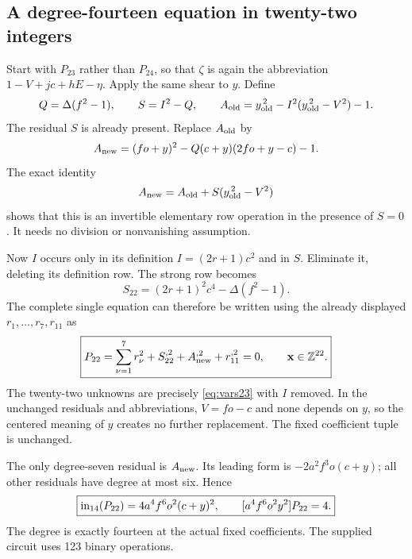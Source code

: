 \subsection{A degree-fourteen equation in twenty-two integers}

Start with $P_{23}$ rather than $P_{24}$, so that $\zeta$ is again the
abbreviation $1-V+jc+hE-\eta$. Apply the same shear to $y$. Define
\[
 Q=\Delta(f^2-1),\qquad S=I^2-Q,
 \qquad A_{\rm old}=y_{\rm old}^{\,2}
       -I^2(y_{\rm old}^{\,2}-V^2)-1.
\]
The residual $S$ is already present. Replace $A_{\rm old}$ by
\begin{equation}
 A_{\rm new}=(fo+y)^2-Q(c+y)(2fo+y-c)-1.
 \label{eq:aux22}
\end{equation}
The exact identity
\begin{equation}
 A_{\rm new}=A_{\rm old}+S(y_{\rm old}^{\,2}-V^2)
 \label{eq:row22}
\end{equation}
shows that this is an invertible elementary row operation in the presence
of $S=0$. It needs no division or nonvanishing assumption.

Now $I$ occurs only in its definition $I=(2r+1)c^2$ and in $S$.
Eliminate it, deleting its definition row. The strong row becomes
\begin{equation}
 S_{22}=(2r+1)^2c^4-\Delta(f^2-1).
 \label{eq:strong22}
\end{equation}
The complete single equation can therefore be written using the already
displayed $r_1,\ldots,r_7,r_{11}$ as
\begin{equation}
 \boxed{P_{22}=\sum_{\nu=1}^{7}r_\nu^2
              +S_{22}^{,2}+A_{\rm new}^{,2}+r_{11}^{,2}=0,
 \qquad\mathbf x\in\mathbb Z^{22}.}
 \label{eq:P22}
\end{equation}
The twenty-two unknowns are precisely \eqref{eq:vars23} with $I$
removed. In the unchanged residuals and abbreviations, $V=fo-c$ and
none depends on $y$, so the centered meaning of $y$ creates no further
replacement. The fixed coefficient tuple is unchanged.

The only degree-seven residual is $A_{\rm new}$. Its leading form is
$-2a^2f^3o(c+y)$; all other residuals have degree at most six. Hence
\begin{equation}
 \boxed{\operatorname{in}_{14}(P_{22})=4a^4f^6o^2(c+y)^2,
 \qquad[a^4f^6o^2y^2]P_{22}=4.}
 \label{eq:leading22}
\end{equation}
The degree is exactly fourteen at the actual fixed coefficients.
The supplied circuit uses 123 binary operations.

